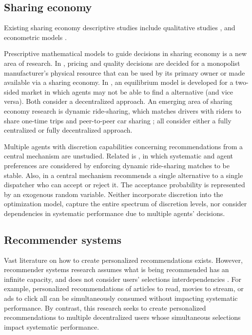 \documentclass[11pt, letterpaper]{article}
\begin{document}
\subsection{Sharing economy}
Existing sharing economy descriptive studies include qualitative studies 
\cite{bardhi2012access, belk2014you, corciolani2014gift, deakin2010markets,  johnson1998growth, lewis2012p2p, murphy2016shared}, and econometric models  \cite{cullen2014outsourcing, fradkin2015bias}.   

Prescriptive mathematical models to guide decisions in sharing economy is a new area of research.    In \cite{jiang2016collaborative}, pricing and quality decisions are decided for a monopolist manufacturer's physical resource that can be used by its primary owner or made available via a sharing economy. In \cite{benjaafar2015peer}, an equilibrium model is developed for a two-sided  market in which agents may not be able to find a alternative (and vice versa).    Both consider a decentralized approach. An emerging area of sharing economy research is dynamic ride-sharing, which matches drivers with riders to share one-time trips  \cite{agatz2012optimization,  furuhata2013ridesharing, kleiner2011mechanism, li2014share, stiglic2016making, winter2006ad, xing2009smize} and peer-to-peer car sharing \cite{hampshire2011peer, hampshiresinhasimulation,   shaheen2013carsharing, steininger2014extending}; all consider either a fully centralized or fully decentralized approach.

Multiple agents with discretion capabilities concerning recommendations from a central mechanism are unstudied.  Related is \cite{wang2014stable}, in which  systematic  and agent preferences are considered by enforcing dynamic ride-sharing matches to be stable.  Also, in \cite{powell2000value} a central mechanism recommends a single alternative to a single dispatcher who can accept or reject it.     %
The acceptance probability is represented by an exogenous random variable.  Neither incorporate discretion into the optimization model, capture the entire spectrum of discretion levels, nor  consider dependencies in systematic performance due to multiple agents' decisions.  

\subsection{Recommender systems}
Vast literature on how to create personalized recommendations exists.  However, recommender systems research assumes what is being recommended has an infinite capacity, and does not consider users' selections interdependencies  \cite{adomavicius2005toward, amatriain2011data, condliff1999bayesian, ekstrand2011collaborative, lops2011content, pazzani2007content, schafer2007collaborative}. For example, personalized recommendations of articles to read, movies to stream, or ads to click all can be simultaneously consumed without impacting systematic performance.     
By contrast, this research seeks to  create personalized recommendations to multiple decentralized users whose simultaneous selections impact systematic performance. 
\end{document}
